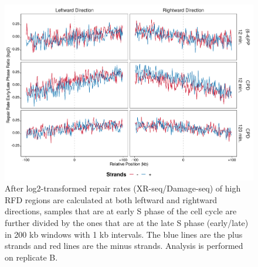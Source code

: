 \begin{figure}[H]
\begin{center}
\includegraphics[width=\textwidth]{Chapters/7_appendix/figures/supfig71}
\caption[Repair rate early/late ratio of high RFDs in 200 kb (replicate B).]{After log2-transformed repair rates (XR-seq/Damage-seq) of high RFD regions are calculated at both leftward and rightward directions, samples that are at early S phase of the cell cycle are further divided by the ones that are at the late S phase (early/late) in 200 kb windows with 1 kb intervals. The blue lines are the plus strands and red lines are the minus strands. Analysis is performed on replicate B.}
\label{supfig:rrel200rfdB}
\end{center}
\end{figure}

